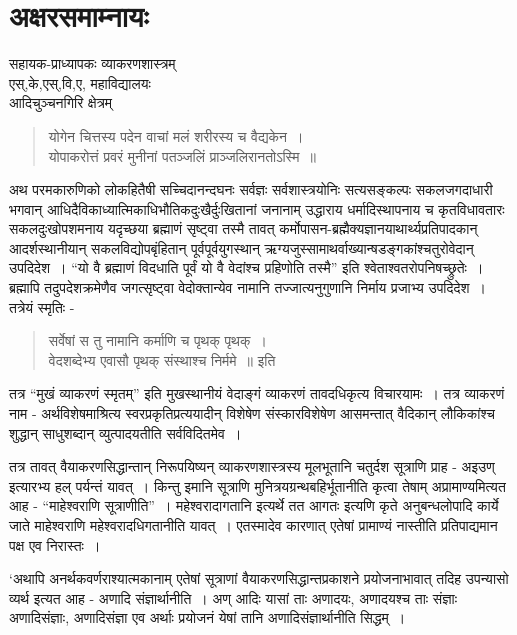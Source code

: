 {\fontsize{15}{17}\selectfont
\presetvalues
\chapter{अक्षरसमाम्नायः}

\begin{center}
\smallskip

सहायक-प्राध्यापकः व्याकरणशास्त्रम्\\
एस्,के,एस्,वि,ए, महाविद्यालयः\\
आदिचुञ्चनगिरि क्षेत्रम् 
\addrule
\end{center}

\begin{verse}
योगेन चित्तस्य पदेन वाचां मलं शरीरस्य च वैद्यकेन~। \\
योपाकरोत्तं प्रवरं मुनीनां पतञ्जलिं प्राञ्जलिरानतोऽस्मि~॥
\end{verse}
अथ परमकारुणिको लोकहितैषी सच्चिदानन्दघनः सर्वज्ञः सर्वशास्त्रयोनिः सत्यसङ्कल्पः सकलजगदाधारी भगवान् आधिदैविकाध्यात्मिकाधिभौतिकदुःखैर्दुःखितानां जनानाम् उद्धाराय धर्मादिस्थापनाय च कृतविधावतारः सकलदुःखोपशमनाय यदृच्छया ब्रह्माणं सृष्ट्वा तस्मै तावत् कर्मोपासन-ब्रह्मैक्यज्ञानयाथार्थ्यप्रतिपादकान् आदर्शस्थानीयान् सकलविद्योपबृंहितान् पूर्वपूर्वयुगस्थान् ऋग्यजुस्सामाथर्वाख्यान्षडङ्गकांश्चतुरोवेदान् उपदिदेश~। “यो वै ब्रह्माणं विदधाति पूर्वं यो वै वेदांश्च प्रहिणोति तस्मै” इति श्वेताश्वतरोपनिषच्छ्रुतेः~। ब्रह्मापि तदुपदेशक्रमेणैव जगत्सृष्ट्वा वेदोक्तान्येव नामानि तज्जात्यनुगुणानि निर्माय प्रजाभ्य उपदिदेश~। तत्रेयं स्मृतिः -		
\begin{verse}
सर्वेषां स तु नामानि कर्माणि च पृथक् पृथक्~। \\
वेदशब्देभ्य एवासौ पृथक् संस्थाश्च निर्ममे~॥ इति
\end{verse} 		
तत्र “मुखं व्याकरणं स्मृतम्” इति मुखस्थानीयं वेदाङ्गं व्याकरणं तावदधिकृत्य विचारयामः~। तत्र व्याकरणं नाम  - अर्थविशेषमाश्रित्य स्वरप्रकृतिप्रत्ययादीन् विशेषेण संस्कारविशेषेण आसमन्तात्  वैदिकान् लौकिकांश्च शुद्धान् साधुशब्दान् व्युत्पादयतीति सर्वविदितमेव~। 

तत्र तावत् वैयाकरणसिद्धान्तान् निरूपयिष्यन् व्याकरणशास्त्रस्य मूलभूतानि चतुर्दश सूत्राणि प्राह - अइउण् इत्यारभ्य हल् पर्यन्तं यावत्~। किन्तु इमानि सूत्राणि मुनित्रयग्रन्थबहिर्भूतानीति कृत्वा तेषाम् अप्रामाण्यमित्यत आह - “माहेश्वराणि सूत्राणीति”~। महेश्वरादागतानि इत्यर्थे तत आगतः इत्यणि कृते अनुबन्धलोपादि कार्ये जाते माहेश्वराणि महेश्वरादधिगतानीति यावत्~। एतस्मादेव कारणात् एतेषां प्रामाण्यं नास्तीति प्रतिपाद्यमान पक्ष एव निरास्तः~। 

‘अथापि अनर्थकवर्णराश्यात्मकानाम् एतेषां सूत्राणां वैयाकरणसिद्धान्तप्रकाशने प्रयोजनाभावात् तदिह उपन्यासो व्यर्थ इत्यत आह - अणादि संज्ञार्थानीति~। अण् आदिः  यासां ताः अणादयः, अणादयश्च ताः संज्ञाः अणादिसंज्ञाः, अणादिसंज्ञा एव अर्थाः  प्रयोजनं येषां तानि अणादिसंज्ञार्थानीति सिद्धम्~। 

}
